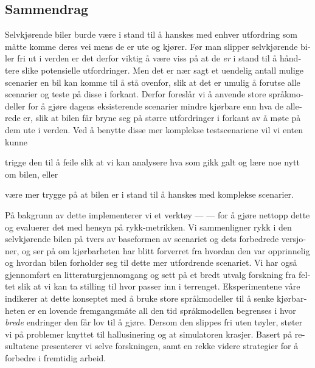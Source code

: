 \begin{otherlanguage}{norsk}
    \chapter*{Sammendrag}
    Selvkjørende biler burde være i stand til å hanskes med enhver utfordring
    som måtte komme deres vei mens de er ute og kjører. Før man slipper
    selvkjørende biler fri ut i verden er det derfor viktig å være viss på at de
    \emph{er} i stand til å håndtere slike potensielle utfordringer. Men det er
    nær sagt et uendelig antall mulige scenarier en bil kan komme til å stå
    ovenfor, slik at det er umulig å forutse alle scenarier og teste på disse i
    forkant. Derfor foreslår vi å anvende store språkmodeller for å gjøre dagens
    eksisterende scenarier mindre kjørbare enn hva de allerede er, slik at
    bilen får bryne seg på større utfordringer i forkant av å møte på dem ute i
    verden. Ved å benytte disse mer komplekse testscenariene vil vi enten kunne
    \begin{inparaenum}
        \item trigge den til å feile slik at vi kan analysere hva som gikk galt
        og lære noe nytt om bilen, eller
        \item være mer trygge på at bilen er i stand til å hanskes med komplekse
        scenarier.
    \end{inparaenum}
    På bakgrunn av dette implementerer vi et verktøy --- \hefe{} --- for å gjøre
    nettopp dette og evaluerer det med hensyn på rykk-metrikken. Vi sammenligner
    rykk i den selvkjørende bilen på tvers av baseformen av scenariet og dets
    forbedrede versjoner, og ser på om kjørbarheten har blitt forverret fra
    hvordan den var opprinnelig og hvordan bilen forholder seg til dette mer
    utfordrende scenariet. Vi har også gjennomført en litteraturgjennomgang og
    sett på et bredt utvalg forskning fra feltet slik at vi kan ta stilling til
    hvor \hefe{} passer inn i terrenget. Eksperimentene våre indikerer at dette
    konseptet med å bruke store språkmodeller til å senke kjørbarheten er en
    lovende fremgangsmåte all den tid språkmodellen begrenses i hvor
    \emph{brede} endringer den får lov til å gjøre. Dersom den slippes fri uten
    tøyler, støter vi på problemer knyttet til hallusinering og at simulatoren
    krasjer. Basert på resultatene presenterer vi selve forskningen, samt en
    rekke videre strategier for å forbedre \hefe{} i fremtidig arbeid.

\end{otherlanguage}

